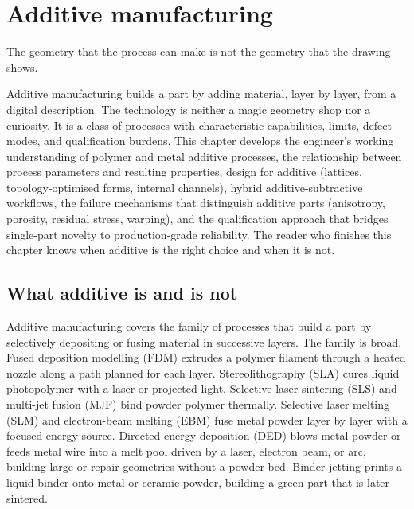\chapter{Additive manufacturing}
\label{vol08:ch07}

\epigraph{The geometry that the process can make is not the geometry that the drawing shows.}{}


\noindent
Additive manufacturing builds a part by adding material, layer by layer, from a digital description. The technology is neither a magic geometry shop nor a curiosity. It is a class of processes with characteristic capabilities, limits, defect modes, and qualification burdens. This chapter develops the engineer's working understanding of polymer and metal additive processes, the relationship between process parameters and resulting properties, design for additive (lattices, topology-optimised forms, internal channels), hybrid additive-subtractive workflows, the failure mechanisms that distinguish additive parts (anisotropy, porosity, residual stress, warping), and the qualification approach that bridges single-part novelty to production-grade reliability. The reader who finishes this chapter knows when additive is the right choice and when it is not.

\section{What additive is and is not}

Additive manufacturing covers the family of processes that build a part by selectively depositing or fusing material in successive layers. The family is broad. Fused deposition modelling (FDM) extrudes a polymer filament through a heated nozzle along a path planned for each layer. Stereolithography (SLA) cures liquid photopolymer with a laser or projected light. Selective laser sintering (SLS) and multi-jet fusion (MJF) bind powder polymer thermally. Selective laser melting (SLM) and electron-beam melting (EBM) fuse metal powder layer by layer with a focused energy source. Directed energy deposition (DED) blows metal powder or feeds metal wire into a melt pool driven by a laser, electron beam, or arc, building large or repair geometries without a powder bed. Binder jetting prints a liquid binder onto metal or ceramic powder, building a green part that is later sintered.

